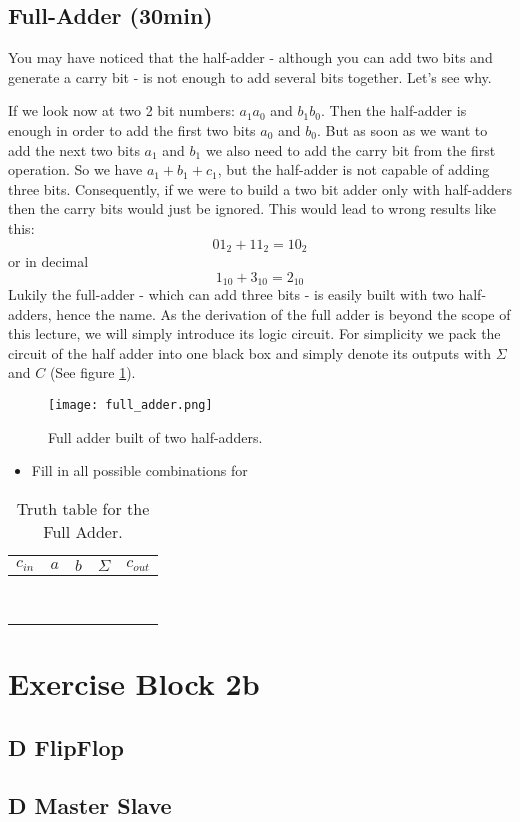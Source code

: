 \subsection{Full-Adder (30min)}
You may have noticed that the half-adder - although you can add two bits and generate a carry bit - is not enough to add several bits together. Let's see why.

If we look now at two 2 bit numbers: $a_1a_0$ and $b_1b_0$. Then the half-adder is enough in order to add the first two bits $a_0$ and $b_0$. But as soon as we want to add the next two bits $a_1$ and $b_1$ we also need to add the carry bit from the first operation. So we have $a_1+b_1+c_1$, but the half-adder is not capable of adding three bits. Consequently, if we were to build a two bit adder only with half-adders then the carry bits would just be ignored. This would lead to wrong results like this:
\[
	01_2 + 11_2 = 10_2
\]
or in decimal
\[
	1_{10} + 3_{10} = 2_{10}
\]
Lukily the full-adder - which can add three bits - is easily built with two half-adders, hence the name. As the derivation of the full adder is beyond the scope of this lecture, we will simply introduce its logic circuit. For simplicity we pack the circuit of the half adder into one black box and simply denote its outputs with $\Sigma$ and $C$ (See figure \ref{fig:full-adder}).

\begin{figure}[h]
	\centering		  
	\texttt{[image: full\_adder.png]}
	\caption{Full adder built of two half-adders.}
	\label{fig:full-adder}
\end{figure}
\begin{itemize}
	\item Fill in all possible combinations for
\end{itemize}
\begin{table}[]
	\centering
	\begin{tabular}{|c|c|c||c|c|}
		\hline
		$c_{in}$ & $a$ & $b$ & $\Sigma$ & $c_{out}$ \\ \hline
		&     &     &          &           \\ \hline
		&     &     &          &           \\ \hline
		&     &     &          &           \\ \hline
		&     &     &          &           \\ \hline
		&     &     &          &           \\ \hline
		&     &     &          &           \\ \hline
		&     &     &          &           \\ \hline
		&     &     &          &           \\ \hline
	\end{tabular}
	\caption{Truth table for the Full Adder.}
	\label{tab:full-adder-truth-table}
\end{table}

\section{Exercise Block 2b}
\subsection{D FlipFlop}
\subsection{D Master Slave}

\newpage